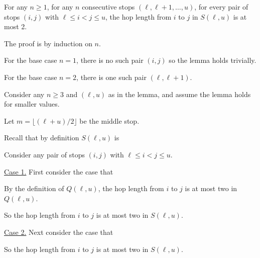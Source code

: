 \begin{lemma}
  For any $n\ge 1$, for any $n$ consecutive stops $(\ell, \ell+1, \ldots, u)$,
  for every pair of stops $(i, j)$ with $\ell \le i < j \le u$,
  the hop length from $i$ to $j$ in $S(\ell, u)$ is at most 2.
\end{lemma}
\begin{longFormProof}
  \step The proof is by induction on $n$.

  \step\label{step: bus 2 base 1}
  For the base case $n=1$, there is no such pair $(i, j)$ so the lemma holds trivially. 

  \step\label{step: bus 2 base 2}
  For the base case $n=2$,
  there is one such pair $(\ell, \ell+1)$.
  \BLUE{
    \REPLACEME
  }

  \smallskip
  
  \begin{block}\label{block: bus 2 induction}
    \step\label{step: assumption}
    Consider any $n\ge 3$ and $(\ell, u)$ as in the lemma, and assume the lemma holds for smaller values.
    
    \step Let $m=\lfloor (\ell+u)/2 \rfloor$ be the middle stop.
    
    \step Recall that by definition $S(\ell, u)$ is \BLUE{
      \REPLACEME
    }
    
    \smallskip
    
    \begin{block}\label{block: bus ij}
      \step Consider any pair of stops $(i, j)$ with $\ell \le i < j \le u$.

      \begin{block}
        \step \underline{Case 1.} First consider the case that \BLUE{
          \(
          \REPLACEME
          \)
        }

        \step By the definition of $Q(\ell, u)$, the hop length from $i$ to $j$ is at most two in $Q(\ell, u)$.

        \step So the hop length from $i$ to $j$ is at most two in $S(\ell, u)$.
      \end{block}

      \begin{block}
        \step \underline{Case 2.} Next consider the case that \BLUE{
          \REPLACEME
        }

        \step \BLUE{
          \REPLACEME
        }

        \step So the hop length from $i$ to $j$ is at most two in $S(\ell, u)$. 
      \end{block}


\end{block}
\end{block}
\end{longFormProof}
